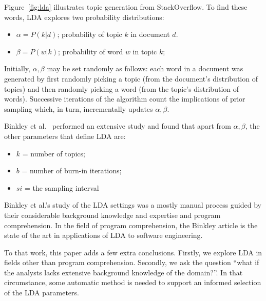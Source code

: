 \documentclass[twocolumn,5p,sort&compress]{elsarticle}
\newcommand{\bi}{\begin{itemize}}
\newcommand{\ei}{\end{itemize}}
\theoremstyle{break}
\begin{document}
Figure~\ref{fig:lda} illustrates topic generation from StackOverflow.
To find these words, LDA explores two probability distributions:
\bi
\item $\alpha=P(k|d)$; probability of topic $k$ in  document $d$.
\item $\beta=P(w|k)$; probability of word $w$ in topic $k$; 
\ei
  Initially, $\alpha,\beta$ may be set randomly as follows:
each word in a document was generated by first randomly picking a topic (from
the document’s distribution of topics) and then randomly picking a word (from
the topic’s distribution of words). Successive iterations of the algorithm 
count the implications of prior sampling which, in turn,  incrementally updates $\alpha,\beta$.

Binkley et al.~\cite{binkley2014understanding} performed an extensive study and found that 
apart from $\alpha,\beta$, the other parameters that define LDA
are:
\bi
\item $k$ = number of topics;
\item $b$ = number of burn-in iterations;
\item $si$ = the sampling interval
\ei
Binkley et al.'s study of the LDA settings was a mostly manual process
guided by their considerable background knowledge and expertise and program
comprehension.
In the field of program comprehension, the Binkley article
is the state of the art in applications of LDA to software engineering.

To that work, this paper adds a few extra conclusions.
Firstly, we explore LDA in fields other than program comprehension.
Secondly, we ask the question ``what if the analysts lacks extensive background knowledge
of the domain?''. In that circumstance, some automatic method is needed to support
an informed selection of the LDA parameters.

 
\end{document}
